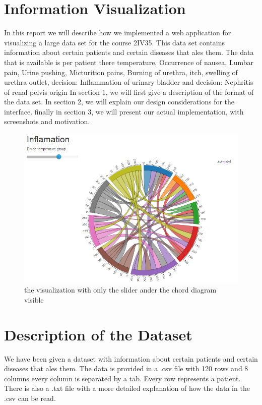 \documentclass[a4paper,twoside,11pt]{article}
\begin{document}
\section*{Information Visualization}
In this report we will describe how we implemented a web application for visualizing a large data set for the course 2IV35. This data set contains information about certain patients and certain diseases that ales them. \newline
The data that is available is per patient there temperature, Occurrence of nausea, Lumbar pain, Urine pushing, Micturition pains,  Burning of urethra, itch, swelling of urethra outlet, decision: Inflammation of urinary bladder and decision: Nephritis of renal pelvis origin \newline
In section 1, we will first give a description of the format of the data set. \newline
In section 2, we will explain our design considerations for the interface. \newline
finally in section 3, we will present our actual implementation, with screenshots and motivation. \newline
\begin{figure}[h]
    \includegraphics[width=\textwidth]{images/chordDiagram.PNG}
    \caption{the visualization with only the slider ander the chord diagram visible}
    \label{fig:overView}
\end{figure}
\newpage
\section{Description of the Dataset}
We have been given a dataset with information about certain patients and certain diseases that ales them. The data is provided in a .csv file with 120 rows and 8 columns every column is separated by a tab. Every row represents a patient. There is also a .txt file with a more detailed explanation of how the data in the .csv can be read.
\end{document}
